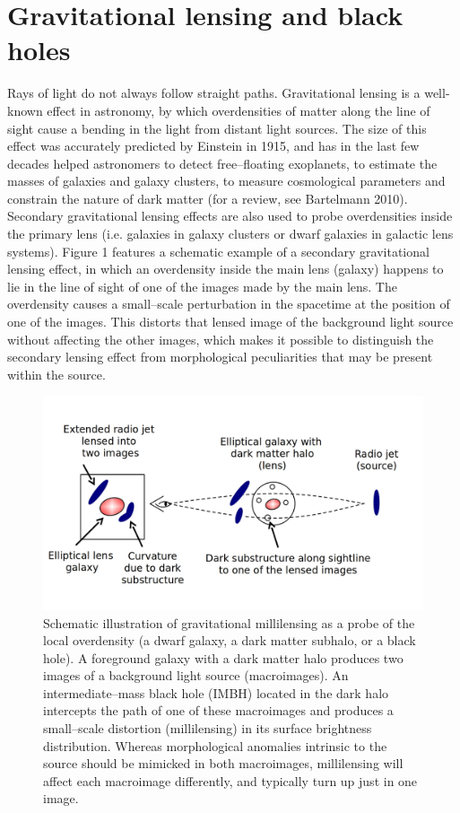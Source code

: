\documentclass[a4paper, 11pt]{article}
\begin{document}
\section{Gravitational lensing and black holes}
Rays of light do not always follow straight paths. Gravitational lensing is a well-known effect in astronomy, by which overdensities of matter along the line of sight cause a bending in the light from distant light sources. The size of this effect was accurately predicted by Einstein in 1915, and has in the last few decades helped astronomers to detect free--floating exoplanets, to estimate the masses of galaxies and galaxy clusters, to measure cosmological parameters and constrain the nature of dark matter (for a review, see Bartelmann 2010). Secondary gravitational lensing effects are also used to probe overdensities inside the primary lens (i.e. galaxies in galaxy clusters or dwarf galaxies in galactic lens systems). Figure 1 features a schematic example of a secondary gravitational lensing effect, in which an overdensity inside the main lens (galaxy) happens to lie in the line of sight of one of the images made by the main lens. The overdensity causes a small--scale perturbation in the spacetime at the position of one of the images. This distorts that lensed image of the background light source without affecting the other images, which makes it possible to distinguish the secondary lensing effect from morphological peculiarities that may be present within the source.

\begin{figure}[tbh]
\centering
\includegraphics[scale=0.3]{Figure-lensing-v3.jpg}
\caption{Schematic illustration of gravitational millilensing as a probe of the local overdensity (a dwarf galaxy, a dark matter subhalo, or a black hole). A foreground galaxy with a dark matter halo produces two images of a background light source (macroimages). An intermediate--mass black hole (IMBH) located in the dark halo intercepts the path of one of these macroimages and produces a small--scale distortion (millilensing) in its surface brightness distribution. Whereas morphological anomalies intrinsic to the source should be mimicked in both macroimages, millilensing will affect each macroimage differently, and typically turn up just in one image.}
\end{figure}
\end{document}
